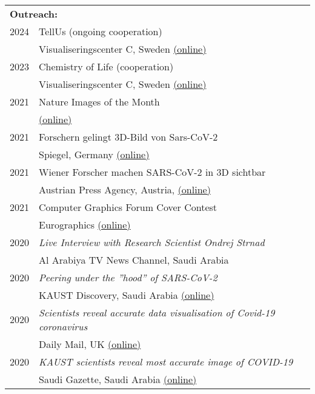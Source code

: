 \documentclass[a4paper,11pt]{letter}
\begin{document}
~\\

\begin{tabular}{l| l}
\multicolumn{2}{l}{\textbf{Outreach:}} \\
2024 & TellUs (ongoing cooperation)\\
 &  Visualiseringscenter C, Sweden \href{https://visualiseringscenter.se/en/research-program/tellus/}{(online)}\\
2023 & Chemistry of Life (cooperation)\\
 &  Visualiseringscenter C, Sweden \href{https://visualiseringscenter.se/en/show/chemistry-of-life/}{(online)}\\
2021 & Nature Images of the Month\\
 & \href{https://www.nature.com/immersive/d41586-021-00095-y/index.html}{(online)}\\
2021 & Forschern gelingt 3D-Bild von Sars-CoV-2\\
 & Spiegel, Germany \href{https://www.spiegel.de/wissenschaft/natur/coronavirus-forschen-gelingt-3d-bild-von-sars-cov-2-a-81ae87b9-b12e-4345-87fc-a5d46f648b08}{(online)}\\
2021 & Wiener Forscher machen SARS-CoV-2 in 3D sichtbar\\
 & Austrian Press Agency, Austria, \href{https://science.apa.at/power-search/1516016075791438832}{(online)}\\
2021 & Computer Graphics Forum Cover Contest\\
 & Eurographics \href{https://www.eg.org/wp/cover-contest/}{(online)}\\
2020 & \emph{Live Interview with Research Scientist Ondrej Strnad} \\
 & Al Arabiya TV News Channel, Saudi Arabia \\
2020 & \emph{Peering under the ''hood'' of SARS-CoV-2} \\
 & KAUST Discovery, Saudi Arabia \href{https://discovery.kaust.edu.sa/en/article/6361/peering-under-the-hood-of-sars-cov-2/}{(online)}\\
2020 & \emph{Scientists reveal accurate data visualisation of Covid-19 coronavirus} \\
 & Daily Mail, UK \href{https://www.dailymail.co.uk/sciencetech/article-8929221/Scientists-reveal-accurate-date-visualisation-Covid-19-coronavirus-yet.html}{(online)}\\
2020 & \emph{KAUST scientists reveal most accurate image of COVID-19} \\
 & Saudi Gazette, Saudi Arabia \href{https://www.saudigazette.com.sa/article/600140/SAUDI-ARABIA/KAUST-scientists-reveal-most-accurate-image-of-COVID-19}{(online)}\\

\end{tabular}
\end{document}
